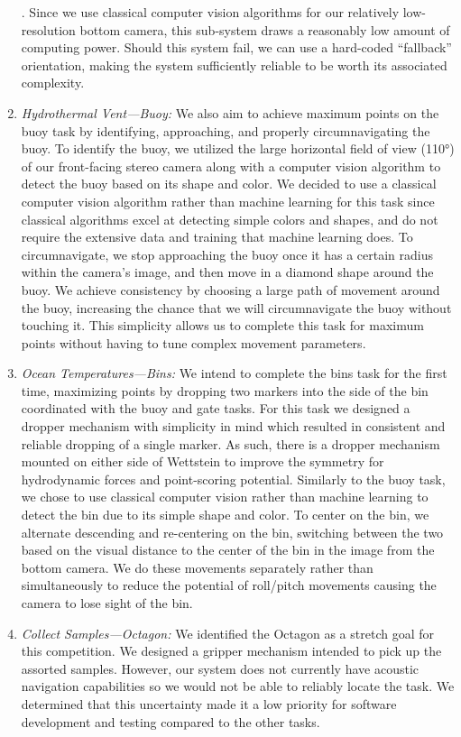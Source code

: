 \documentclass[conference]{IEEEtran}
\begin{document}
\begin{enumerate}
. Since we use classical computer vision algorithms for our relatively low-resolution bottom camera, this sub-system draws a reasonably low amount of computing power. Should this system fail, we can use a hard-coded “fallback” orientation, making the system sufficiently reliable to be worth its associated complexity.
\item \textit{Hydrothermal Vent---Buoy:}
We also aim to achieve maximum points on the buoy task by identifying, approaching, and properly circumnavigating the buoy. To identify the buoy, we utilized the large horizontal field of view (110°) of our front-facing stereo camera along with a computer vision algorithm to detect the buoy based on its shape and color. We decided to use a classical computer vision algorithm rather than machine learning for this task since classical algorithms excel at detecting simple colors and shapes, and do not require the extensive data and training that machine learning does. To circumnavigate, we stop approaching the buoy once it has a certain radius within the camera’s image, and then move in a diamond shape around the buoy. We achieve consistency by choosing a large path of movement around the buoy, increasing the chance that we will circumnavigate the buoy without touching it. This simplicity allows us to complete this task for maximum points without having to tune complex movement parameters.
\item \textit{Ocean Temperatures---Bins:} We intend to complete the bins task for the first time, maximizing points by dropping two markers into the side of the bin coordinated with the buoy and gate tasks. For this task we designed a dropper mechanism with simplicity in mind which resulted in consistent and reliable dropping of a single marker. As such, there is a dropper mechanism mounted on either side of Wettstein to improve the symmetry for hydrodynamic forces and point-scoring potential. Similarly to the buoy task, we chose to use classical computer vision rather than machine learning to detect the bin due to its simple shape and color. To center on the bin, we alternate descending and re-centering on the bin, switching between the two based on the visual distance to the center of the bin in the image from the bottom camera. We do these movements separately rather than simultaneously to reduce the potential of roll/pitch movements causing the camera to lose sight of the bin. 
\item \textit{Collect Samples---Octagon:} We identified the Octagon as a stretch goal for this competition. We designed a gripper mechanism intended to pick up the assorted samples. However, our system does not currently have acoustic navigation capabilities so we would not be able to reliably locate the task. We determined that this uncertainty made it a low priority for software development and testing compared to the other tasks.
\end{enumerate}
\end{document}
